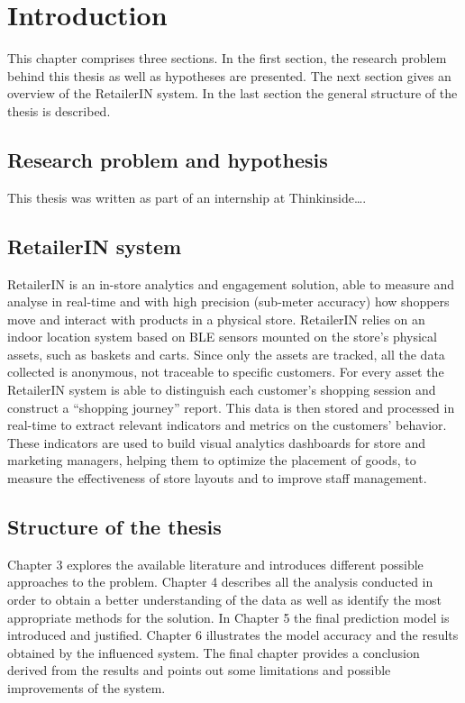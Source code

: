 \chapter{Introduction}
\label{cha:introduction}

This chapter comprises three sections. In the first section, the research problem behind this thesis as well as hypotheses are presented. The next section gives an overview of the RetailerIN system. In the last section the general structure of the thesis is described.

\section{Research problem and hypothesis}
\label{sec:research_problem}

This thesis was written as part of an internship at Thinkinside….

\section{RetailerIN system}
\label{sec:retailerin_system}

RetailerIN is an in-store analytics and engagement solution, able to measure and analyse in real-time and with high precision (sub-meter accuracy) how shoppers move and interact with products in a physical store. RetailerIN relies on an indoor location system based on BLE sensors mounted on the store’s physical assets, such as baskets and carts. Since only the assets are tracked, all the data collected is anonymous, not traceable to specific customers. For every asset the RetailerIN system is able to distinguish each customer’s shopping session and construct a “shopping journey” report. This data is then stored and processed in real-time to extract relevant indicators and metrics on the customers’ behavior. These indicators are used to build visual analytics dashboards for store and marketing managers, helping them to optimize the placement of goods, to measure the effectiveness of store layouts and to improve staff management.

\section{Structure of the thesis}
\label{sec:structure_of_the_thesis}

Chapter 3 explores the available literature and introduces different possible approaches to the problem. Chapter 4 describes all the analysis conducted in order to obtain a better understanding of the data as well as identify the most appropriate methods for the solution. In Chapter 5 the final prediction model is introduced and justified. Chapter 6 illustrates the model accuracy and the results obtained by the influenced system. The final chapter provides a conclusion derived from the results and points out some limitations and possible improvements of the system.

\clearpage